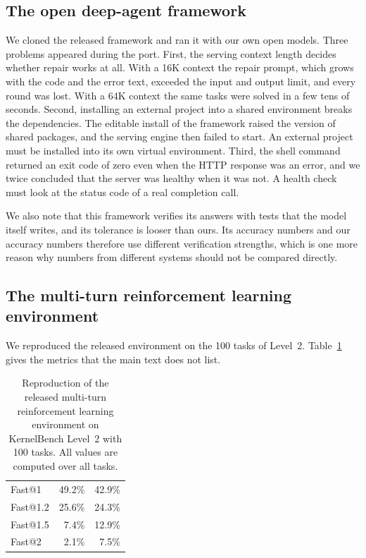 \subsection{The open deep-agent framework}
We cloned the released framework and ran it with our own open models. Three problems appeared during
the port. First, the serving context length decides whether repair works at all. With a 16K context
the repair prompt, which grows with the code and the error text, exceeded the input and output
limit, and every round was lost. With a 64K context the same tasks were solved in a few tens of
seconds. Second, installing an external project into a shared environment breaks the dependencies.
The editable install of the framework raised the version of shared packages, and the serving engine
then failed to start. An external project must be installed into its own virtual environment. Third,
the shell command returned an exit code of zero even when the HTTP response was an error, and we
twice concluded that the server was healthy when it was not. A health check must look at the status
code of a real completion call.

We also note that this framework verifies its answers with tests that the model itself writes, and
its tolerance is looser than ours. Its accuracy numbers and our accuracy numbers therefore use
different verification strengths, which is one more reason why numbers from different systems should
not be compared directly.

\subsection{The multi-turn reinforcement learning environment}
We reproduced the released environment on the 100 tasks of Level~2. Table~\ref{tab:repro} gives the
metrics that the main text does not list.

\begin{table}[h]
\centering
\small
\setlength{\tabcolsep}{7pt}
\caption{Reproduction of the released multi-turn reinforcement learning environment on KernelBench
Level~2 with 100 tasks. All values are computed over all tasks.}
\label{tab:repro}
\begin{tabular}{@{}lrr@{}}
\toprule
\headrow{Metric} & \headrow{Original paper} & \headrow{Our reproduction} \\
\midrule
Fast@1   & 49.2\% & 42.9\% \\
Fast@1.2 & 25.6\% & 24.3\% \\
Fast@1.5 & 7.4\%  & 12.9\% \\
Fast@2   & 2.1\%  & 7.5\%  \\
\bottomrule
\end{tabular}
\end{table}

